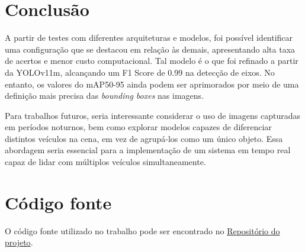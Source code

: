 \section{Conclusão}
    A partir de testes com diferentes arquiteturas e modelos, foi possível identificar uma configuração que se destacou em relação às demais, apresentando alta taxa de acertos e menor custo computacional. Tal modelo é o que foi refinado a partir da YOLOv11m, alcançando um F1 Score de 0.99 na detecção de eixos. No entanto, os valores do mAP50-95 ainda podem ser aprimorados por meio de uma definição mais precisa das \textit{bounding boxes} nas imagens.

    Para trabalhos futuros, seria interessante considerar o uso de imagens capturadas em períodos noturnos, bem como explorar modelos capazes de diferenciar distintos veículos na cena, em vez de agrupá-los como um único objeto. Essa abordagem seria essencial para a implementação de um sistema em tempo real capaz de lidar com múltiplos veículos simultaneamente.


\section{Código fonte}
    O código fonte utilizado no trabalho pode ser encontrado no \href{https://github.com/matheusprv/truck-axle-detection}{Repositório do projeto}.